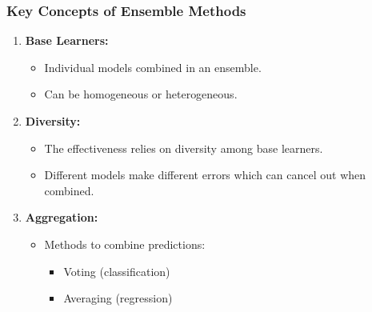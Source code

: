 \documentclass[aspectratio=169]{beamer}
\begin{document}
\begin{frame}[fragile]
    \frametitle{Key Concepts of Ensemble Methods}

    \begin{enumerate}
        \item \textbf{Base Learners:}
            \begin{itemize}
                \item Individual models combined in an ensemble.
                \item Can be homogeneous or heterogeneous.
            \end{itemize}

        \item \textbf{Diversity:}
            \begin{itemize}
                \item The effectiveness relies on diversity among base learners.
                \item Different models make different errors which can cancel out when combined.
            \end{itemize}

        \item \textbf{Aggregation:}
            \begin{itemize}
                \item Methods to combine predictions:
                    \begin{itemize}
                        \item Voting (classification)
                        \item Averaging (regression)
                    \end{itemize}
            \end{itemize}
    \end{enumerate}
\end{frame}
\end{document}
